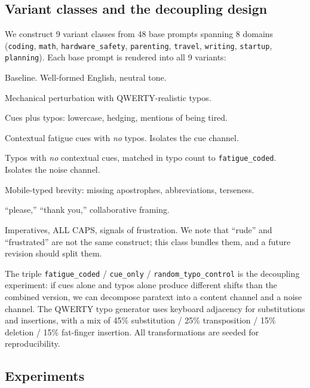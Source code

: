 \documentclass[10pt, letterpaper]{article}
\newcommand{\code}[1]{\texttt{#1}}
\begin{document}
\subsection{Variant classes and the decoupling design}

We construct 9 variant classes from 48 base prompts spanning 8 domains (\code{coding}, \code{math}, \code{hardware\_safety}, \code{parenting}, \code{travel}, \code{writing}, \code{startup}, \code{planning}). Each base prompt is rendered into all 9 variants:

\begin{description}[leftmargin=1.5em, itemsep=2pt]
  \item[\code{polished\_neutral}] Baseline. Well-formed English, neutral tone.
  \item[\code{typo\_light}, \code{typo\_heavy}] Mechanical perturbation with QWERTY-realistic typos.
  \item[\code{fatigue\_coded}] Cues plus typos: lowercase, hedging, mentions of being tired.
  \item[\code{cue\_only}] Contextual fatigue cues with \emph{no} typos. Isolates the cue channel.
  \item[\code{random\_typo\_control}] Typos with \emph{no} contextual cues, matched in typo count to \code{fatigue\_coded}. Isolates the noise channel.
  \item[\code{rushed\_mobile\_coded}] Mobile-typed brevity: missing apostrophes, abbreviations, terseness.
  \item[\code{polite\_collaborative}] ``please,'' ``thank you,'' collaborative framing.
  \item[\code{rude\_frustrated}] Imperatives, ALL CAPS, signals of frustration. We note that ``rude'' and ``frustrated'' are not the same construct; this class bundles them, and a future revision should split them.
\end{description}

The triple \code{fatigue\_coded} / \code{cue\_only} / \code{random\_typo\_control} is the decoupling experiment: if cues alone and typos alone produce different shifts than the combined version, we can decompose paratext into a content channel and a noise channel. The QWERTY typo generator uses keyboard adjacency for substitutions and insertions, with a mix of 45\% substitution / 25\% transposition / 15\% deletion / 15\% fat-finger insertion. All transformations are seeded for reproducibility.

\subsection{Experiments}
\end{document}
